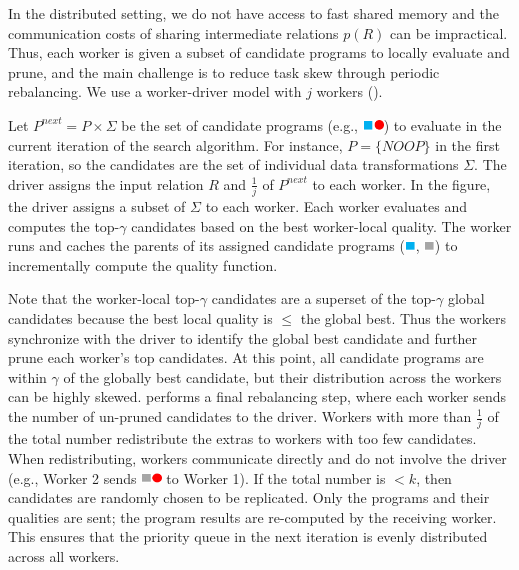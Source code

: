 In the distributed setting, we do not have access to fast shared memory and the communication costs of sharing intermediate relations $p(R)$ can be impractical.  Thus, each worker is given a subset of candidate programs to locally evaluate and prune, and the main challenge is to reduce task skew through periodic rebalancing.  We use a worker-driver model with $j$ workers ().

Let $P^{next} = P\times \Sigma$ be the set of candidate programs (e.g., \includegraphics[height=8pt]{figures/program.pdf}) to evaluate in the current iteration of the search algorithm. For instance, $P=\{NOOP\}$ in the first iteration, so the candidates are the set of individual data transformations $\Sigma$.   The driver assigns the input relation $R$ and $\frac{1}{j}$ of $P^{next}$ to each worker.  In the figure, the driver assigns a subset of $\Sigma$ to each worker.  Each worker evaluates and computes the top-$\gamma$ candidates based on the best worker-local quality.   The worker runs and caches the parents of its assigned candidate programs (\includegraphics[height=8pt]{figures/sq-blue.pdf}, \includegraphics[height=8pt]{figures/sq-grey.pdf}) to incrementally compute the quality function.
  
Note that the worker-local top-$\gamma$ candidates are a superset of the top-$\gamma$ global candidates because the best local quality is $\le$ the global best.   Thus the workers synchronize with the driver to identify the global best candidate and further prune each worker's top candidates.  At this point, all candidate programs are within $\gamma$ of the globally best candidate, but their distribution across the workers can be highly skewed.  \sys performs a final rebalancing step, where each worker sends the number of un-pruned candidates to the driver.  Workers with more than $\frac{1}{j}$ of the total number redistribute the extras to workers with too few candidates.  When redistributing, workers communicate directly and do not involve the driver (e.g., Worker 2 sends \includegraphics[height=8pt]{figures/program-greyred.pdf} to Worker 1).   If the total number is $<k$, then candidates are randomly chosen to be replicated.  Only the programs and their qualities are sent; the program results are re-computed by the receiving worker.  This ensures that the priority queue in the next iteration is evenly distributed across all workers.  

